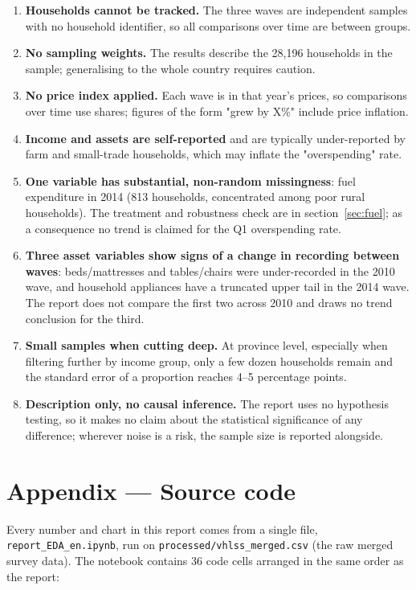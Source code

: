 \documentclass[11pt,a4paper]{article}
\newcommand{\n}[1]{\textbf{#1}}
\begin{document}
\begin{enumerate}[leftmargin=1.5em,itemsep=4pt,topsep=3pt]
\item \n{Households cannot be tracked.} The three waves are independent samples with no household identifier, so all comparisons over time are between groups.
\item \n{No sampling weights.} The results describe the 28,196 households in the sample; generalising to the whole country requires caution.
\item \n{No price index applied.} Each wave is in that year's prices, so comparisons over time use shares; figures of the form "grew by X\%" include price inflation.
\item \n{Income and assets are self-reported} and are typically under-reported by farm and small-trade households, which may inflate the "overspending" rate.
\item \n{One variable has substantial, non-random missingness}: fuel expenditure in 2014 (813 households, concentrated among poor rural households). The treatment and robustness check are in section~\ref{sec:fuel}; as a consequence no trend is claimed for the Q1 overspending rate.
\item \n{Three asset variables show signs of a change in recording between waves}: beds/mattresses and tables/chairs were under-recorded in the 2010 wave, and household appliances have a truncated upper tail in the 2014 wave. The report does not compare the first two across 2010 and draws no trend conclusion for the third.
\item \n{Small samples when cutting deep.} At province level, especially when filtering further by income group, only a few dozen households remain and the standard error of a proportion reaches 4–5 percentage points.
\item \n{Description only, no causal inference.} The report uses no hypothesis testing, so it makes no claim about the statistical significance of any difference; wherever noise is a risk, the sample size is reported alongside.
\end{enumerate}

\section*{Appendix — Source code}

Every number and chart in this report comes from a single file, \texttt{report\_EDA\_en.ipynb}, run on \texttt{processed/vhlss\_merged.csv} (the raw merged survey data). The notebook contains 36 code cells arranged in the same order as the report:
\end{document}

